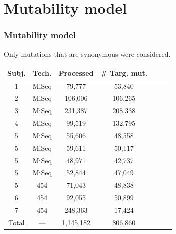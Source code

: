 \documentclass{beamer}\usepackage[]{graphicx}\usepackage[]{color}
\begin{document}
\section{Mutability model}
\begin{frame}
    \frametitle{Mutability model}

    {\color{blue} Only mutations that are synonymous were considered.}
    { \footnotesize
    \begin{table}[]
    \centering
    \begin{tabular}{ccccccc}
    \hline
    \multicolumn{1}{|c|}{\bf Subj.}   & \multicolumn{1}{c|}{\bf Tech.} & \multicolumn{1}{c|}{\bf Processed} & \multicolumn{1}{c|}{\# \bf Targ. mut.}  \\ \hline
    \multicolumn{1}{|c|}{1}           & \multicolumn{1}{c|}{MiSeq}     & \multicolumn{1}{c|}{79,777   }     & \multicolumn{1}{c|}{53,840}           \\
    \multicolumn{1}{|c|}{2}           & \multicolumn{1}{c|}{MiSeq}     & \multicolumn{1}{c|}{106,006  }     & \multicolumn{1}{c|}{106,265}           \\
    \multicolumn{1}{|c|}{3}           & \multicolumn{1}{c|}{MiSeq}     & \multicolumn{1}{c|}{231,387  }     & \multicolumn{1}{c|}{208,338}           \\
    \multicolumn{1}{|c|}{4}           & \multicolumn{1}{c|}{MiSeq}     & \multicolumn{1}{c|}{99,519   }     & \multicolumn{1}{c|}{132,795}           \\ \cline{1-4}
    \multicolumn{1}{|c|}{5}           & \multicolumn{1}{c|}{MiSeq}     & \multicolumn{1}{c|}{55,606   }     & \multicolumn{1}{c|}{48,558}           \\
    \multicolumn{1}{|c|}{5}           & \multicolumn{1}{c|}{MiSeq}     & \multicolumn{1}{c|}{59,611   }     & \multicolumn{1}{c|}{50,117}           \\
    \multicolumn{1}{|c|}{5}           & \multicolumn{1}{c|}{MiSeq}     & \multicolumn{1}{c|}{48,971   }     & \multicolumn{1}{c|}{42,737}           \\
    \multicolumn{1}{|c|}{5}           & \multicolumn{1}{c|}{MiSeq}     & \multicolumn{1}{c|}{52,844   }     & \multicolumn{1}{c|}{47,049}           \\ \cline{1-4}
    \multicolumn{1}{|c|}{5}           & \multicolumn{1}{c|}{454}       & \multicolumn{1}{c|}{71,043   }     & \multicolumn{1}{c|}{48,838}           \\
    \multicolumn{1}{|c|}{6}           & \multicolumn{1}{c|}{454}       & \multicolumn{1}{c|}{92,055   }     & \multicolumn{1}{c|}{50,899}           \\
    \multicolumn{1}{|c|}{7}           & \multicolumn{1}{c|}{454}       & \multicolumn{1}{c|}{248,363  }     & \multicolumn{1}{c|}{17,424}           \\ \hline
    \multicolumn{1}{|c|}{Total}       & \multicolumn{1}{c|}{---}       & \multicolumn{1}{c|}{1,145,182}     & \multicolumn{1}{c|}{806,860}           \\ \cline{1-4}
    \end{tabular}
    \end{table}
    }
\end{frame}
\end{document}
